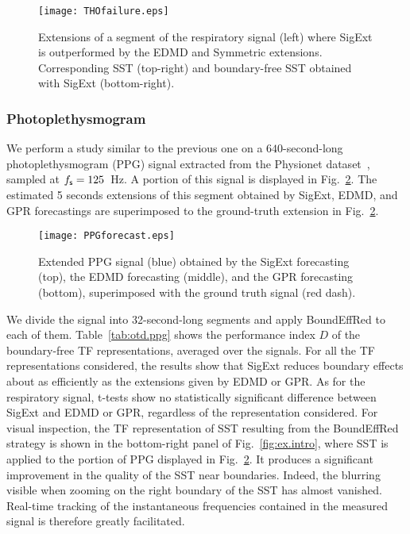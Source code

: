 \begin{figure}
\centering
\texttt{[image: THOfailure.eps]}
\caption{Extensions of a segment of the respiratory signal (left) where {\sf SigExt} is outperformed by the EDMD and Symmetric extensions. Corresponding SST (top-right) and boundary-free SST obtained with {\sf SigExt} (bottom-right).}
\label{fig:THO.failure}
\end{figure} 

\subsubsection{Photoplethysmogram}
\label{ssse:ppg}
We perform a study similar to the previous one on a $640$-second-long photoplethysmogram (PPG) signal extracted from the Physionet dataset~\cite{Pimentel17toward, Goldberger00physiobank}, sampled at $f_{\mathsf s}=125$~Hz. A portion of this signal is displayed in Fig.~\ref{fig:ppg}. The estimated 5 seconds extensions of this segment obtained by {\sf SigExt}, EDMD, and GPR forecastings  are superimposed to the ground-truth extension in Fig.~\ref{fig:ppg}.

\begin{figure}
\texttt{[image: PPGforecast.eps]}
\caption{Extended PPG signal (blue) obtained by the {\sf SigExt} forecasting (top), the EDMD forecasting (middle), and the GPR forecasting (bottom), superimposed with the ground truth signal (red dash).}
\label{fig:ppg}
\end{figure}

We divide the signal into 32-second-long segments and apply {\sf BoundEffRed} to each of them. Table~\ref{tab:otd.ppg} shows the performance index $D$ of the boundary-free TF representations, averaged over the signals. For all the TF representations considered, the results show that {\sf SigExt} reduces boundary effects about as efficiently as the extensions given by EDMD or GPR. As for the respiratory signal, t-tests show no statistically significant difference between {\sf SigExt} and EDMD or GPR, regardless of the representation considered. For visual inspection, the TF representation of SST resulting from the {\sf BoundEffRed} strategy is shown in the bottom-right panel of Fig.~\ref{fig:ex.intro}, where SST is applied to the portion of PPG displayed in Fig.~\ref{fig:ppg}. It produces a significant improvement in the quality of the SST near boundaries. Indeed, the blurring visible when zooming on the right boundary of the SST has almost vanished. Real-time tracking of the instantaneous frequencies contained in the measured signal is therefore greatly facilitated.


